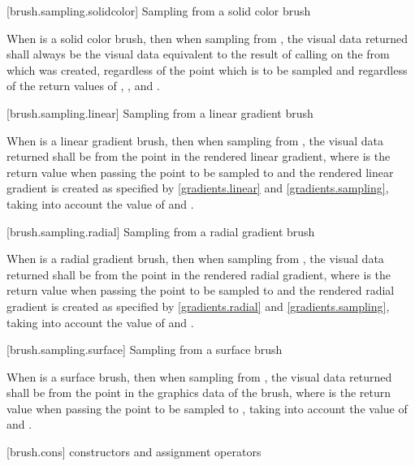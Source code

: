  [brush.sampling.solidcolor] {Sampling from a solid color brush}

\pnum
When  is a solid color brush, then when sampling from , the visual data returned shall always be the visual data equivalent to the result of calling  on the  from which  was created, regardless of the point which is to be sampled and regardless of the return values of , , and .

 [brush.sampling.linear] {Sampling from a linear gradient brush}

\pnum
When  is a linear gradient brush, then when sampling from , the visual data returned shall be from the point  in the rendered linear gradient, where  is the return value when passing the point to be sampled to  and the rendered linear gradient is created as specified by \ref{gradients.linear} and \ref{gradients.sampling}, taking into account the value of  and .

 [brush.sampling.radial] {Sampling from a radial gradient brush}

\pnum
When  is a radial gradient brush, then when sampling from , the visual data returned shall be from the point  in the rendered radial gradient, where  is the return value when passing the point to be sampled to  and the rendered radial gradient is created as specified by \ref{gradients.radial} and \ref{gradients.sampling}, taking into account the value of  and .

 [brush.sampling.surface] {Sampling from a surface brush}

\pnum
When  is a surface brush, then when sampling from , the visual data returned shall be from the point  in the graphics data of the brush, where  is the return value when passing the point to be sampled to , taking into account the value of  and .

 [brush.cons] { constructors and assignment operators}

